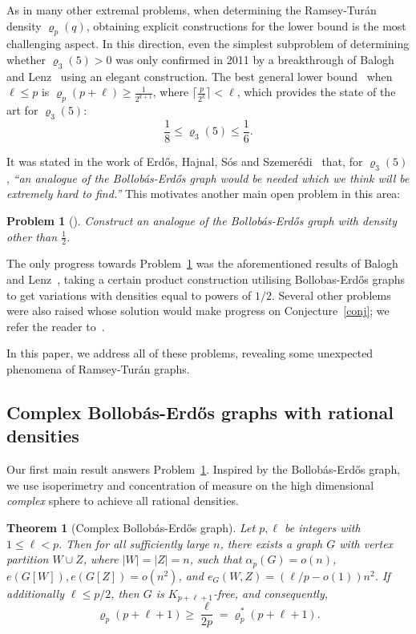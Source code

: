 \documentclass[11pt, a4paper]{article}
\newtheorem{theorem}{Theorem}[section]
\newtheorem{probx}[conjx]{Problem}
\theoremstyle{definition}
\begin{document}
As in many other extremal problems, when determining the Ramsey-Tur\'an density $\varrho_p(q)$, obtaining explicit constructions for the lower bound is the most challenging aspect. In this direction, even the simplest subproblem of determining whether $\varrho_3(5)>0$ was only confirmed in 2011 by a breakthrough of Balogh and Lenz~\cite{BL-1} using an elegant construction. The best general lower bound~\cite{BL-2} when $\ell\le p$ is $\varrho_p(p+\ell)\ge \frac{1}{2^{k+1}}$, where $\lceil \frac{p}{2^k}\rceil<\ell$, which provides the state of the art for $\varrho_3(5)$:
\begin{equation*}%
	\frac{1}{8}\le \varrho_3(5)\le \frac{1}{6}.
\end{equation*}


It was stated in the work of Erd\H{o}s, Hajnal, S\'os and Szemer\'edi~\cite{EHSSz} that, for $\varrho_3(5)$, \emph{``an analogue of the Bollob\'as-Erd\H{o}s graph would be needed which we think will be extremely hard to find.''} This motivates another main open problem in this area:
\begin{probx}[\cite{BL-1,EHSSz}]\label{problem-BE}
	Construct an analogue of the Bollob\'as-Erd\H{o}s graph with density other than $\frac{1}{2}$.
\end{probx}

The only progress towards Problem~\ref{problem-BE} was the aforementioned results of Balogh and Lenz~\cite{BL-1,BL-2}, taking a certain product construction utilising Bollobas-Erd\H{o}s graphs to get variations with densities equal to powers of $1/2$.
Several other problems were also raised whose solution would make progress on Conjecture~\ref{conj}; we refer the reader to~\cite{BL-2,EHSSSz}.

\medskip

In this paper, we address all of these problems, revealing some unexpected phenomena of Ramsey-Tur\'an graphs.

\subsection{Complex Bollob\'as-Erd\H{o}s graphs with rational densities}
Our first main result answers Problem~\ref{problem-BE}.
Inspired by the Bollob\'as-Erd\H{o}s graph, we use isoperimetry and concentration of measure on the high dimensional \emph{complex} sphere to achieve all rational densities.

\begin{theorem}[Complex Bollob\'as-Erd\H{o}s graph]\label{GBE}
	Let $p,\ell$ be integers with $1 \leq \ell <p $. Then for all sufficiently large $n$,  there exists a graph $G$ with vertex partition $W \cup Z$, where $|W|=|Z|=n$, such that $\alpha_p(G) =o(n)$, $e(G[W]), e(G[Z])=o(n^2)$, and $e_G(W,Z) = (\ell/p-o(1))n^2$. If additionally $\ell\le p/2$, then $G$ is $K_{p+\ell+1}$-free, and consequently,
	$$\varrho_p(p+\ell+1) \geq \frac{\ell}{2p} = \varrho_p^*(p+\ell+1).$$
\end{theorem}
\end{document}
